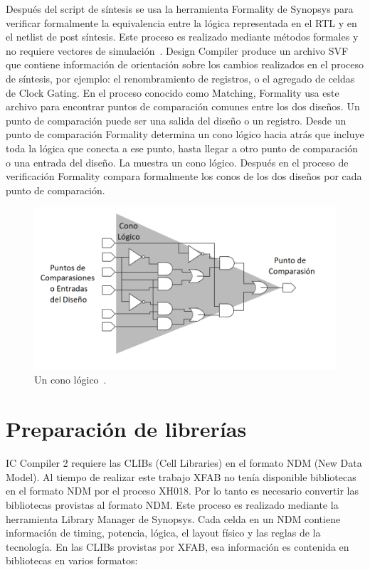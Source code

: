 \documentclass[a4paper, twoside, 11pt]{report}
\begin{document}
Después del script de síntesis se usa la herramienta Formality de Synopsys para verificar formalmente la equivalencia entre la lógica representada en el RTL y en el netlist de post síntesis. Este proceso es realizado mediante métodos formales y no requiere vectores de simulación~\cite[traducido de][]{formality_ug}. Design Compiler produce un archivo SVF que contiene información de orientación sobre los cambios realizados en el proceso de síntesis, por ejemplo: el renombramiento de registros, o el agregado de celdas de Clock Gating. En el proceso conocido como Matching, Formality usa este archivo para encontrar puntos de comparación comunes entre los dos diseños. Un punto de comparación puede ser una salida del diseño o un registro. Desde un punto de comparación Formality determina un cono lógico hacia atrás que incluye toda la lógica que conecta a ese punto, hasta llegar a otro punto de comparación o una entrada del diseño. La  muestra un cono lógico. Después en el proceso de verificación Formality compara formalmente los conos de los dos diseños por cada punto de comparación.

\begin{figure}[htb]
  \centering
  \includegraphics[width=1.0\textwidth]{./img/logic_cones}
  \caption{Un cono lógico~\cite[Adaptado de][]{formality_ug}.}
  \label{fig:logic_cones}
\end{figure}

\FloatBarrier
\section{Preparación de librerías}

IC Compiler 2 requiere las CLIBs (Cell Libraries) en el formato NDM (New Data Model). Al tiempo de realizar este trabajo XFAB no tenía disponible bibliotecas en el formato NDM por el proceso XH018. Por lo tanto es necesario convertir las bibliotecas provistas al formato NDM. Este proceso es realizado mediante la herramienta Library Manager de Synopsys. Cada celda en un NDM contiene información de timing, potencia, lógica, el layout físico y las reglas de la tecnología. En las CLIBs provistas por XFAB, esa información es contenida en bibliotecas en varios formatos:
\end{document}
